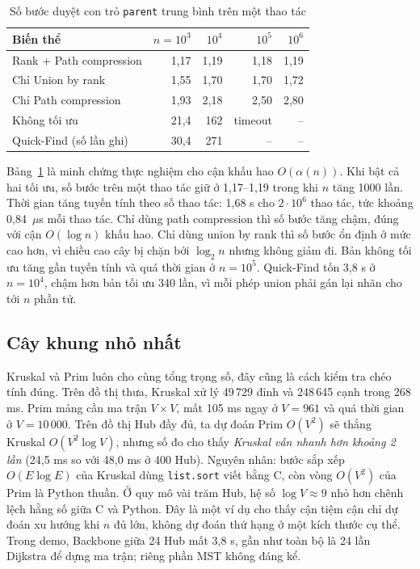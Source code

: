 \begin{table}[t]
\centering
\caption{Số bước duyệt con trỏ \texttt{parent} trung bình trên một thao tác}
\label{tab:dsu}
\begin{tabular}{lrrrr}
\toprule
Biến thể & $n=10^3$ & $10^4$ & $10^5$ & $10^6$ \\
\midrule
Rank + Path compression & 1{,}17 & 1{,}19 & 1{,}18 & 1{,}19 \\
Chỉ Union by rank & 1{,}55 & 1{,}70 & 1{,}70 & 1{,}72 \\
Chỉ Path compression & 1{,}93 & 2{,}18 & 2{,}50 & 2{,}80 \\
Không tối ưu & 21{,}4 & 162 & timeout & -- \\
Quick-Find (số lần ghi) & 30{,}4 & 271 & -- & -- \\
\bottomrule
\end{tabular}
\end{table}

Bảng~\ref{tab:dsu} là minh chứng thực nghiệm cho cận khấu hao $O(\alpha(n))$. Khi bật cả hai tối ưu, số bước trên một thao
tác giữ ở 1{,}17--1{,}19 trong khi $n$ tăng 1000 lần. Thời gian tăng tuyến tính theo số thao tác: 1{,}68 s cho $2\cdot 10^6$
thao tác, tức khoảng 0{,}84~$\mu$s mỗi thao tác. Chỉ dùng path compression thì số bước tăng chậm, đúng với cận
$O(\log n)$ khấu hao. Chỉ dùng union by rank thì số bước ổn định ở mức cao hơn, vì chiều cao cây bị chặn bởi $\log_2 n$ nhưng
không giảm đi. Bản không tối ưu tăng gần tuyến tính và quá thời gian ở $n=10^5$. Quick-Find tốn 3{,}8 s ở $n=10^4$, chậm hơn
bản tối ưu 340 lần, vì mỗi phép union phải gán lại nhãn cho tới $n$ phần tử.

\subsection{Cây khung nhỏ nhất}

Kruskal và Prim luôn cho cùng tổng trọng số, đây cũng là cách kiểm tra chéo tính đúng. Trên đồ thị thưa, Kruskal xử lý
49\,729 đỉnh và 248\,645 cạnh trong 268 ms. Prim mảng cần ma trận $V\times V$, mất 105 ms ngay ở $V=961$ và quá thời gian
ở $V=10\,000$. Trên đồ thị Hub đầy đủ, ta dự đoán Prim $O(V^2)$ sẽ thắng Kruskal $O(V^2\log V)$, nhưng số đo cho thấy
\emph{Kruskal vẫn nhanh hơn khoảng 2 lần} (24{,}5 ms so với 48{,}0 ms ở 400 Hub). Nguyên nhân: bước sắp xếp
$O(E\log E)$ của Kruskal dùng \texttt{list.sort} viết bằng C, còn vòng $O(V^2)$ của Prim là Python thuần. Ở quy mô vài trăm
Hub, hệ số $\log V\approx 9$ nhỏ hơn chênh lệch hằng số giữa C và Python. Đây là một ví dụ cho thấy cận tiệm cận chỉ dự đoán
xu hướng khi $n$ đủ lớn, không dự đoán thứ hạng ở một kích thước cụ thể. Trong demo, Backbone giữa 24 Hub mất 3{,}8 s, gần
như toàn bộ là 24 lần Dijkstra để dựng ma trận; riêng phần MST không đáng kể.

